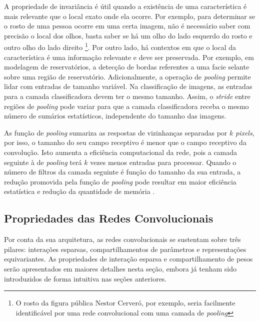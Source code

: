 A propriedade de invariância é útil quando a existência de uma característica é mais relevante que
o local exato onde ela ocorre. Por exemplo, para determinar se o rosto de uma pessoa ocorre em uma certa imagem, não é necessário saber
com precisão o local dos olhos, basta saber se há um olho do lado esquerdo do rosto e outro olho do lado direito
\footnote{O rosto da figura pública Nestor Cerveró, por exemplo, seria facilmente identificável por uma rede convolucional com uma camada de \textit{pooling}}.
Por outro lado, há contextos em que o local da característica é uma informação relevante e deve ser preservada. 
Por exemplo, em modelagem de reservatórios, a detecção de bordas referentes a uma facie selante sobre uma região de reservatório.
Adicionalmente, a operação de \textit{pooling} permite lidar com entradas de tamanho variável. Na classificação de imagens,
as entradas para a camada classificadora devem ter o mesmo tamanho. Assim, o \textit{stride} entre regiões de \textit{pooling} pode variar
para que a camada classificadora receba o mesmo número de sumários estatísticos, independente do tamanho das imagens.

As função de \textit{pooling} sumariza as respostas de vizinhanças separadas por $k$ \textit{pixels}, por isso, o tamanho do seu campo receptivo é menor
que o campo receptivo da convolução. Isto aumenta a eficiência computacional da rede, pois a camada seguinte à de \textit{pooling} terá $k$ vezes
menos entradas para processar. Quando o número de filtros da camada seguinte é função do tamanho da sua entrada, a redução promovida pela
função de \textit{pooling} pode resultar em maior eficiência estatística e redução da quantidade de memória \citep{aurelien17}.

\subsection{Propriedades das Redes Convolucionais}
Por conta da sua arquitetura, as redes convolucionais se sustentam sobre três pilares: interações esparsas, compartilhamentos
de parâmetros e representações equivariantes. As propriedades de interação esparsa e compartilhamento de pesos serão apresentados
em maiores detalhes nesta seção, embora já tenham sido introduzidos de forma intuitiva nas seções anteriores.

